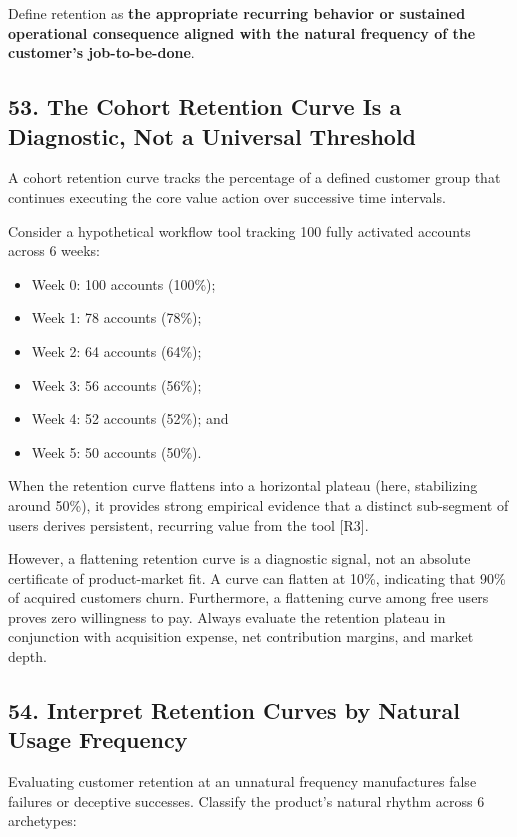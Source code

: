 Define retention as \textbf{the appropriate recurring behavior or sustained operational consequence aligned with the natural frequency of the customer's job-to-be-done}.

\subsection*{53. The Cohort Retention Curve Is a Diagnostic, Not a Universal Threshold}

A cohort retention curve tracks the percentage of a defined customer group that continues executing the core value action over successive time intervals.

Consider a hypothetical workflow tool tracking 100 fully activated accounts across 6 weeks:
\begin{itemize}
    \item Week 0: 100 accounts (100\%);
    \item Week 1: 78 accounts (78\%);
    \item Week 2: 64 accounts (64\%);
    \item Week 3: 56 accounts (56\%);
    \item Week 4: 52 accounts (52\%); and
    \item Week 5: 50 accounts (50\%).
\end{itemize}

When the retention curve flattens into a horizontal plateau (here, stabilizing around 50\%), it provides strong empirical evidence that a distinct sub-segment of users derives persistent, recurring value from the tool [R3].

However, a flattening retention curve is a diagnostic signal, not an absolute certificate of product-market fit. A curve can flatten at 10\%, indicating that 90\% of acquired customers churn. Furthermore, a flattening curve among free users proves zero willingness to pay. Always evaluate the retention plateau in conjunction with acquisition expense, net contribution margins, and market depth.

\subsection*{54. Interpret Retention Curves by Natural Usage Frequency}

Evaluating customer retention at an unnatural frequency manufactures false failures or deceptive successes. Classify the product's natural rhythm across 6 archetypes:

